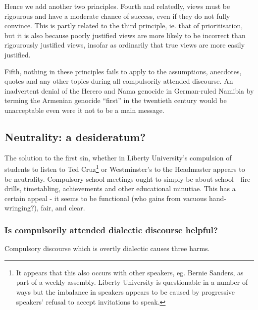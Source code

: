 \documentclass[12pt,a4paper]{report}
\begin{document}
\begin{multicols}{2}
Hence we add another two principles. Fourth and relatedly, views must be
rigourous and have a moderate chance of success, even if they do not
fully convince. This is partly related to the third principle, ie. that
of prioritisation, but it is also because poorly justified views are
more likely to be incorrect than rigourously justified views, insofar as
ordinarily that true views are more easily justified.

Fifth, nothing in these principles fails to apply to the assumptions,
anecdotes, quotes and any other topics during all compulsorily attended
discourse. An inadvertent denial of the Herero and Nama genocide in
German-ruled Namibia by terming the Armenian genocide ``first'' in the
twentieth century would be unacceptable even were it not to be a main
message.

\subsection{Neutrality: a
	desideratum?}\label{neutrality-a-desideratum}

The solution to the first sin, whether in Liberty University's
compulsion of students to listen to Ted Cruz\footnote{It appears that
	this also occurs with other speakers, eg. Bernie Sanders, as part of a
	weekly assembly. Liberty University is questionable in a number of
	ways but the imbalance in speakers appears to be caused by progressive
	speakers' refusal to accept invitations to speak.} or Westminster's to
the Headmaster appears to be neutrality. Compulsory school meetings
ought to simply be about school - fire drills, timetabling, achievements
and other educational minutiae. This has a certain appeal - it seems to
be functional (who gains from vacuous hand-wringing?), fair, and clear.

\subsubsection{Is compulsorily attended dialectic discourse
	helpful?}\label{is-compulsorily-attended-dialectic-discourse-helpful}

Compulsory discourse which is overtly dialectic causes three harms.


\end{multicols}
\end{document}

